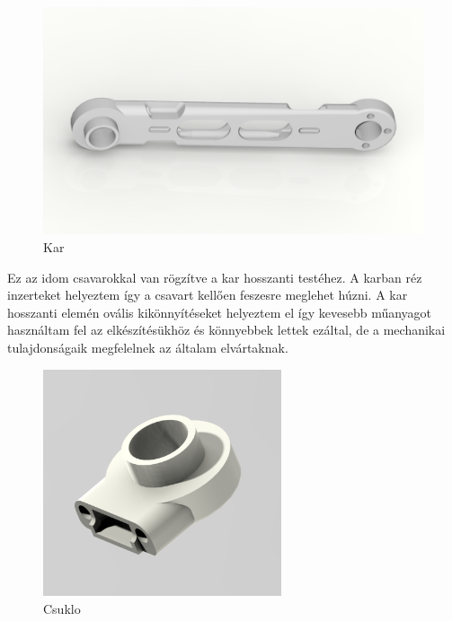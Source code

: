 \begin{figure}[!ht]
\centering
\includegraphics[width=150mm, keepaspectratio]{figures/Diploma_CAD/creo3.png}
\caption{Kar}
\label{fig:kar}
\end{figure}

Ez az idom csavarokkal van rögzítve a kar hosszanti testéhez. A karban réz inzerteket helyeztem így a csavart kellően feszesre meglehet húzni. A kar hosszanti elemén ovális kikönnyítéseket helyeztem el így kevesebb műanyagot használtam fel az elkészítésükhöz és könnyebbek lettek ezáltal, de a mechanikai tulajdonságaik megfelelnek az általam elvártaknak.

\begin{figure}[!ht]
\centering
\includegraphics[width=70mm, keepaspectratio]{figures/Diploma_CAD/creo4.png}
\caption{Csuklo}
\label{fig:Csuklo_egyedul}
\end{figure}

